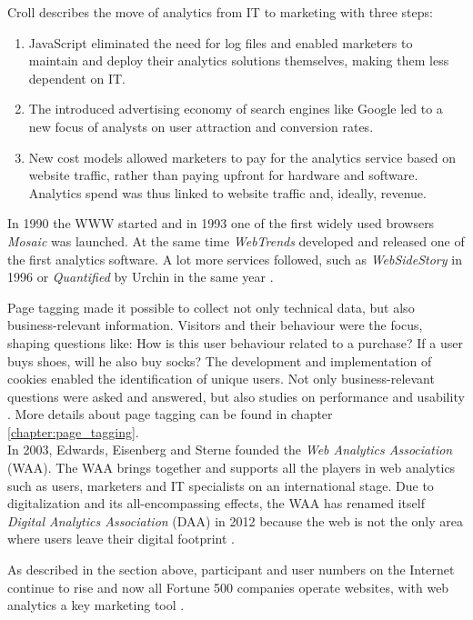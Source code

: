 Croll describes the move of analytics from IT to marketing with three steps: \cite{2009Croll}
\begin{enumerate}
\item JavaScript eliminated the need for log files and enabled marketers to maintain and deploy their analytics solutions themselves, making them less dependent on IT.
\item The introduced advertising economy of search engines like Google led to a new focus of analysts on user attraction and conversion rates.
\item New cost models allowed marketers to pay for the analytics service based on website traffic, rather than paying upfront for hardware and software. Analytics spend was thus linked to website traffic and, ideally, revenue.
\end{enumerate}

In 1990 the WWW started and in 1993 one of the first widely used browsers \textit{Mosaic} was launched.
At the same time \textit{WebTrends} developed and released one of the first analytics software.
A lot more services followed, such as \textit{WebSideStory} in 1996 \cite{2009Croll}
or \textit{Quantified} by Urchin in the same year \cite{2009Croll}.

Page tagging made it possible to collect not only technical data, but also business-relevant information.
Visitors and their behaviour were the focus, shaping questions like: How is this user behaviour related to a purchase? If a user buys shoes, will he also buy socks?
The development and implementation of cookies enabled the identification of unique users.
Not only business-relevant questions were asked and answered, but also studies on performance and usability \cite{2009Croll}. %
More details about page tagging can be found in chapter \ref{chapter:page_tagging}.
\\

In 2003, Edwards, Eisenberg and Sterne founded the \textit{Web Analytics Association} (WAA).
The WAA brings together and supports all the players in web analytics such as users, marketers and IT specialists on an international stage.
Due to digitalization and its all-encompassing effects, the WAA has renamed itself \textit{Digital Analytics Association} (DAA) in 2012 because the web is not the only area where users leave their digital footprint \cite{2014Singal}.

As described in the section above, participant and user numbers on the Internet continue to rise and now all Fortune 500 companies operate websites, with web analytics a key marketing tool \cite{2019Kumar}.

